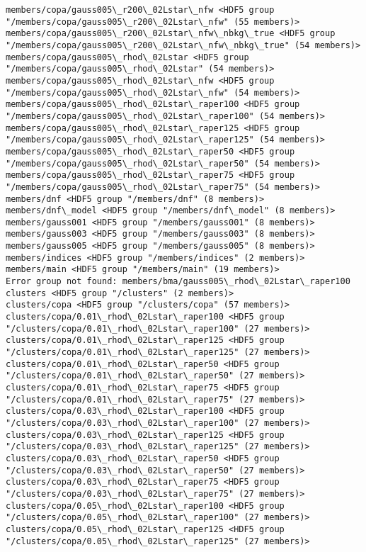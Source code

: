 \documentclass[11pt]{article}
\begin{document}
\begin{Verbatim}[commandchars=\\\{\}]
members/copa/gauss005\_r200\_02Lstar\_nfw <HDF5 group "/members/copa/gauss005\_r200\_02Lstar\_nfw" (55 members)>
members/copa/gauss005\_r200\_02Lstar\_nfw\_nbkg\_true <HDF5 group "/members/copa/gauss005\_r200\_02Lstar\_nfw\_nbkg\_true" (54 members)>
members/copa/gauss005\_rhod\_02Lstar <HDF5 group "/members/copa/gauss005\_rhod\_02Lstar" (54 members)>
members/copa/gauss005\_rhod\_02Lstar\_nfw <HDF5 group "/members/copa/gauss005\_rhod\_02Lstar\_nfw" (54 members)>
members/copa/gauss005\_rhod\_02Lstar\_raper100 <HDF5 group "/members/copa/gauss005\_rhod\_02Lstar\_raper100" (54 members)>
members/copa/gauss005\_rhod\_02Lstar\_raper125 <HDF5 group "/members/copa/gauss005\_rhod\_02Lstar\_raper125" (54 members)>
members/copa/gauss005\_rhod\_02Lstar\_raper50 <HDF5 group "/members/copa/gauss005\_rhod\_02Lstar\_raper50" (54 members)>
members/copa/gauss005\_rhod\_02Lstar\_raper75 <HDF5 group "/members/copa/gauss005\_rhod\_02Lstar\_raper75" (54 members)>
members/dnf <HDF5 group "/members/dnf" (8 members)>
members/dnf\_model <HDF5 group "/members/dnf\_model" (8 members)>
members/gauss001 <HDF5 group "/members/gauss001" (8 members)>
members/gauss003 <HDF5 group "/members/gauss003" (8 members)>
members/gauss005 <HDF5 group "/members/gauss005" (8 members)>
members/indices <HDF5 group "/members/indices" (2 members)>
members/main <HDF5 group "/members/main" (19 members)>
Error group not found: members/bma/gauss005\_rhod\_02Lstar\_raper100
clusters <HDF5 group "/clusters" (2 members)>
clusters/copa <HDF5 group "/clusters/copa" (57 members)>
clusters/copa/0.01\_rhod\_02Lstar\_raper100 <HDF5 group "/clusters/copa/0.01\_rhod\_02Lstar\_raper100" (27 members)>
clusters/copa/0.01\_rhod\_02Lstar\_raper125 <HDF5 group "/clusters/copa/0.01\_rhod\_02Lstar\_raper125" (27 members)>
clusters/copa/0.01\_rhod\_02Lstar\_raper50 <HDF5 group "/clusters/copa/0.01\_rhod\_02Lstar\_raper50" (27 members)>
clusters/copa/0.01\_rhod\_02Lstar\_raper75 <HDF5 group "/clusters/copa/0.01\_rhod\_02Lstar\_raper75" (27 members)>
clusters/copa/0.03\_rhod\_02Lstar\_raper100 <HDF5 group "/clusters/copa/0.03\_rhod\_02Lstar\_raper100" (27 members)>
clusters/copa/0.03\_rhod\_02Lstar\_raper125 <HDF5 group "/clusters/copa/0.03\_rhod\_02Lstar\_raper125" (27 members)>
clusters/copa/0.03\_rhod\_02Lstar\_raper50 <HDF5 group "/clusters/copa/0.03\_rhod\_02Lstar\_raper50" (27 members)>
clusters/copa/0.03\_rhod\_02Lstar\_raper75 <HDF5 group "/clusters/copa/0.03\_rhod\_02Lstar\_raper75" (27 members)>
clusters/copa/0.05\_rhod\_02Lstar\_raper100 <HDF5 group "/clusters/copa/0.05\_rhod\_02Lstar\_raper100" (27 members)>
clusters/copa/0.05\_rhod\_02Lstar\_raper125 <HDF5 group "/clusters/copa/0.05\_rhod\_02Lstar\_raper125" (27 members)>

\end{Verbatim}
\end{document}
